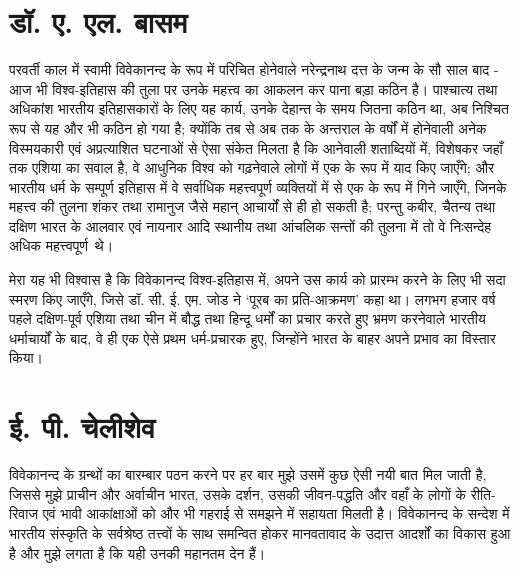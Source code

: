 \section*{डॉ. ए. एल. बासम}


परवर्ती काल में स्वामी विवेकानन्द के रूप में परिचित होनेवाले नरेन्द्रनाथ दत्त के जन्म के सौ साल बाद - आज भी विश्व-इतिहास की तुला पर उनके महत्त्व का आकलन कर पाना बड़ा कठिन है। पाश्चात्य तथा अधिकांश भारतीय इतिहासकारों के लिए यह कार्य, उनके देहान्त के समय जितना कठिन था, अब निश्चित रूप से यह और भी कठिन हो गया है; क्योंकि तब से अब तक के अन्तराल के वर्षों में होनेवाली अनेक विस्मयकारी एवं अप्रत्याशित घटनाओं से ऐसा संकेत मिलता है कि आनेवाली शताब्दियों में, विशेषकर जहाँ तक एशिया का सवाल है, वे आधुनिक विश्व को गढ़नेवाले लोगों में एक के रूप में याद किए जाएँगे; और भारतीय धर्म के सम्पूर्ण इतिहास में वे सर्वाधिक महत्त्वपूर्ण व्यक्तियों में से एक के रूप में गिने जाएँगे, जिनके महत्त्व की तुलना शंकर तथा रामानुज जैसे महान् आचार्यों से ही हो सकती है; परन्तु कबीर, चैतन्य तथा दक्षिण भारत के आलवार एवं नायनार आदि स्थानीय तथा आंचलिक सन्तों की तुलना में तो वे निःसन्देह अधिक महत्त्वपूर्ण~थे। 

\delimiter

मेरा यह भी विश्वास है कि विवेकानन्द विश्व-इतिहास में, अपने उस कार्य को प्रारम्भ करने के लिए भी सदा स्मरण किए जाएँगे, जिसे डॉ. सी. ई. एम. जोड ने ‘पूरब का प्रति-आक्रमण’ कहा था। लगभग हजार वर्ष पहले दक्षिण-पूर्व एशिया तथा चीन में बौद्ध तथा हिन्दू धर्मों का प्रचार करते हुए भ्रमण करनेवाले भारतीय धर्माचार्यों के बाद, वे ही एक ऐसे प्रथम धर्म-प्रचारक हुए, जिन्होंने भारत के बाहर अपने प्रभाव का विस्तार किया।


\section*{ई. पी. चेलीशेव}


विवेकानन्द के ग्रन्थों का बारम्बार पठन करने पर हर बार मुझे उसमें कुछ ऐसी नयी बात मिल जाती है, जिससे मुझे प्राचीन और अर्वाचीन भारत, उसके दर्शन, उसकी जीवन-पद्धति और वहाँ के लोगों के रीति-रिवाज एवं भावी आकांक्षाओं को और भी गहराई से समझने में सहायता मिलती है। विवेकानन्द के सन्देश में भारतीय संस्कृति के सर्वश्रेष्ठ तत्त्वों के साथ समन्वित होकर मानवतावाद के उदात्त आदर्शों का विकास हुआ है और मुझे लगता है कि यही उनकी महानतम देन हैं। 

